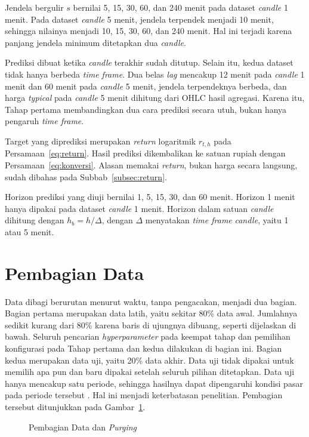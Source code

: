 Jendela bergulir $s$ bernilai 5, 15, 30, 60, dan 240 menit pada dataset
\textit{candle} 1 menit. Pada dataset \textit{candle} 5 menit, jendela
terpendek menjadi 10 menit, sehingga nilainya menjadi 10, 15, 30, 60, dan
240 menit. Hal ini terjadi karena panjang jendela minimum ditetapkan dua \textit{candle}.

Prediksi dibuat ketika \textit{candle} terakhir sudah ditutup. Selain itu, kedua dataset tidak hanya berbeda \textit{time frame}. Dua belas \textit{lag} mencakup
12 menit pada \textit{candle} 1 menit dan 60 menit pada \textit{candle}
5 menit, jendela terpendeknya berbeda, dan harga \textit{typical} pada
\textit{candle} 5 menit dihitung dari OHLC hasil agregasi. Karena itu, Tahap pertama membandingkan dua cara prediksi secara utuh, bukan hanya pengaruh \textit{time frame}.

Target yang diprediksi merupakan \textit{return} logaritmik $r_{t,h}$ pada
Persamaan~\eqref{eq:return}. Hasil prediksi dikembalikan ke satuan rupiah
dengan Persamaan~\eqref{eq:konversi}. Alasan memakai \textit{return}, bukan
harga secara langsung, sudah dibahas pada Subbab~\ref{subsec:return}.

Horizon prediksi yang diuji bernilai 1, 5, 15, 30, dan 60 menit. Horizon
1 menit hanya dipakai pada dataset \textit{candle} 1 menit. Horizon dalam
satuan \textit{candle} dihitung dengan $h_b = h / \Delta$, dengan $\Delta$
menyatakan \textit{time frame} \textit{candle}, yaitu 1 atau 5 menit.

\section{Pembagian Data}
\label{sec:bagi}
Data dibagi berurutan menurut waktu, tanpa pengacakan, menjadi dua bagian.
Bagian pertama merupakan data latih, yaitu sekitar 80\% data awal.
Jumlahnya sedikit kurang dari 80\% karena baris di ujungnya dibuang, seperti
dijelaskan di bawah. Seluruh
pencarian \textit{hyperparameter} pada keempat tahap dan pemilihan konfigurasi
pada Tahap pertama dan kedua dilakukan di bagian ini. Bagian kedua merupakan
data uji, yaitu 20\% data akhir. Data uji tidak dipakai untuk memilih apa pun
dan baru dipakai setelah seluruh pilihan ditetapkan. Data uji hanya mencakup
satu periode, sehingga hasilnya dapat dipengaruhi kondisi
pasar pada periode tersebut \cite{tashman2000}. Hal ini menjadi keterbatasan penelitian. Pembagian tersebut ditunjukkan pada
Gambar~\ref{fig:bagi}.

\begin{figure}[!htbp]
  \centering
  \caption{Pembagian Data dan \textit{Purging}}
  \label{fig:bagi}
\end{figure}

